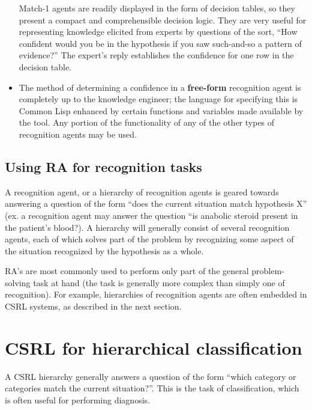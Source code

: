 \begin{itemize}
Match-1 agents are readily displayed in the form of decision tables,
so they present a compact and comprehensible decision logic.  They are
very useful for representing knowledge elicited from experts by
questions of the sort, ``How confident would you be in the hypothesis
if you saw such-and-so a pattern of evidence?''  The expert's reply
establishes the confidence for one row in the decision table.

\item
{}
The method of determining a confidence in a {\bf free-form}
recognition agent is completely up to the knowledge engineer; the
language for specifying this is Common Lisp enhanced by certain
functions and variables made available by the tool. Any portion of the
functionality of any of the other types of recognition agents may be
used.
\end{itemize}


\subsection{Using RA for recognition tasks}

A recognition agent, or a hierarchy of recognition agents is geared
towards answering a question of the form ``does the current situation
match hypothesis X'' (ex. a recognition agent may answer the question
``is anabolic steroid present in the patient's blood?). A hierarchy
will generally consist of several recognition agents, each of which
solves part of the problem by recognizing some aspect of the situation
recognized by the hypothesis as a whole.

RA's are most commonly used to perform only part of the general
problem-solving task at hand (the task is generally more complex than
simply one of recognition). For example, hierarchies of recognition
agents are often embedded in CSRL systems, as described in the next
section.



\section{CSRL for hierarchical classification}

A CSRL hierarchy generally answers a question of the form ``which
category or categories match the current situation?''. This is the task
of classification, which is often useful for performing diagnosis.

